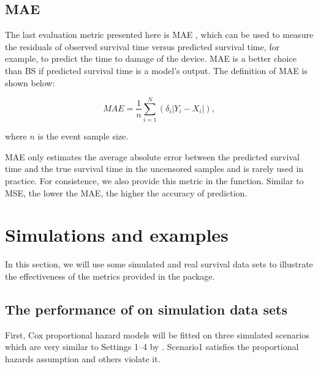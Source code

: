 \subsection{MAE}

The last evaluation metric presented here is MAE \citep{Schemper.1992}, which can be used to measure the residuals of observed survival time versus predicted survival time, for example, to predict the time to damage of the device. MAE is a better choice than BS if predicted survival time is a model's output. The definition of MAE is shown below:


    \begin{equation}\label{MAE}
  MAE=\frac{1}{n} \sum_{i=1}^{N}\left(\delta_{i}\left|Y_{i}-{X}_{i}\right|\right),
  \end{equation}

  \noindent where $n$ is the event sample size.

MAE only estimates the average absolute error between the predicted survival time and the true survival time in the uncensored samples and is rarely used in practice. For consistence, we also provide this metric in the  function. Similar to MSE, the lower the MAE, the higher the accuracy of prediction.


\section{Simulations and examples}\label{sec3}

In this section, we will use some simulated and real survival data sets to illustrate the effectiveness of the metrics provided in the  package.

\subsection{The performance of  on simulation data sets}\label{sec3.1}

First, Cox proportional hazard models will be fitted on three simulated scenarios which are very similar to Settings 1–4 by \cite{Steingrimsson.2019}. Scenario1 satisfies the proportional hazards assumption and others violate it.

